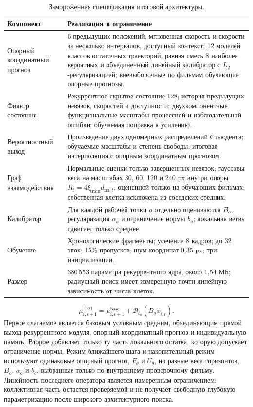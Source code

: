 \documentclass[11pt,a4paper]{article}
\begin{document}
\begin{table}[tb]
\centering
\caption{Замороженная спецификация итоговой архитектуры.}
\label{tab:architecture}
\small
\begin{tabularx}{\textwidth}{@{}L{0.23\textwidth} Y@{}}
\toprule
Компонент & Реализация и ограничение \\
\midrule
Опорный координатный прогноз & 6 предыдущих положений, мгновенная скорость и скорости за несколько интервалов, доступный контекст; 12 моделей классов остаточных траекторий, равная смесь 8 наиболее вероятных и объединенный линейный калибратор с $L_2$-регуляризацией; вневыборочные по фильмам обучающие опорные прогнозы. \\
Фильтр состояния & Рекуррентное скрытое состояние 128; история предыдущих невязок, скоростей и доступности; двухкомпонентные функциональные масштабы процессной и наблюдательной ошибки; обучаемая поправка к усилению. \\
Вероятностный выход & Произведение двух одномерных распределений Стьюдента; обучаемые масштабы и степень свободы; итоговая интерполяция с опорным координатным прогнозом. \\
Граф взаимодействия & Нормальные оценки только завершенных невязок; гауссовы веса на масштабах 30, 60, 120 и 240 px внутри опоры $R_t=4\xi_{\mathrm{train}}d_{\mathrm{nn},t}$, оцененной только на обучающих фильмах; собственная клетка исключена из соседских средних. \\
Калибратор & Для каждой рабочей точки $o$ отдельно оцениваются $B_o$, регуляризация $\alpha_o$ и ограничение нормы $b_o$; локальная ветвь сдвигает только среднее. \\
Обучение & Хронологические фрагменты; усечение 8 кадров; до 32 эпох; 15\% пропусков; шум координат 0,35 px; три инициализации. \\
Размер & 380\,553 параметра рекуррентного ядра, около 1,54 МБ; радиусный поиск имеет измеренную почти линейную зависимость от числа клеток. \\
\bottomrule
\end{tabularx}
\end{table}

\begin{equation}
\mu^{(o)}_{i,t+1}
=
\mu^{\mathrm{base}}_{i,t+1}
+\mathcal B_{b_o}\!\left(B_o\phi_{i,t}\right).
\end{equation}
Первое слагаемое является базовым условным средним, объединяющим прямой выход рекуррентного модуля, опорный координатный прогноз и индивидуальную память. Второе добавляет только ту часть локального остатка, которую допускает ограничение нормы. Режим ближайшего шага и накопительный режим используют одинаковые опорный прогноз, $F_\theta$ и $U_\theta$, но разные веса горизонтов, $B_o$, $\alpha_o$ и $b_o$, выбранные только по внутреннему проверочному фильму. Линейность последнего оператора является намеренным ограничением: коллективная часть остается проверяемой и не получает свободную глубокую параметризацию после широкого архитектурного поиска.
\end{document}
